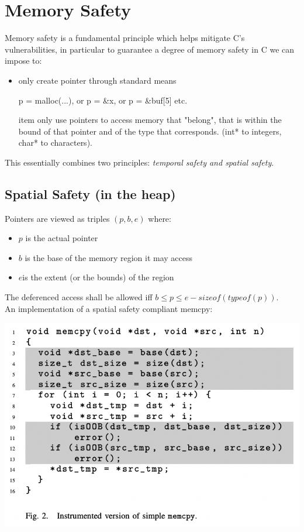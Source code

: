 \documentclass[11pt, oneside]{article}   	%
\begin{document}
\section*{Memory Safety}
Memory safety is a fundamental principle which helps mitigate C's vulnerabilities, in particular to guarantee a degree of memory safety in C we can impose to:
\begin{itemize}
\item only create pointer through standard means
\begin{center}
p  = malloc(...), or p = \&x, or p = \&buf[5] etc.
\end{center}
item only use pointers to access memory that "belong", that is within the bound of that pointer and of the type that corresponds. (int* to integers, char* to characters).
\end{itemize}
This essentially combines two principles: \emph{temporal safety and spatial safety}.


\subsection*{Spatial Safety (in the heap)}
Pointers are viewed as triples $(p, b, e)$ where:
\begin{itemize}
\item $p$ is the actual pointer
\item $b$ is the base of the memory region it may access
\item $e$is the extent (or the bounds) of the region
\end{itemize}
The deferenced access shall be allowed iff $ b \leq p \leq e - sizeof(typeof(p))$. \\ An implementation of a spatial safety compliant memcpy:
\begin{center}
\includegraphics[scale = 0.6]{memsef}
\end{center}
\end{document}
